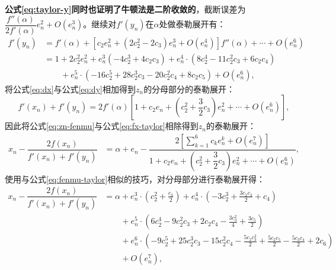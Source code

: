 \textbf{公式\ref{eq:taylor-y}同时也证明了牛顿法是二阶收敛的}，截断误差为$\dfrac{f''(\alpha)}{2f'(\alpha)}e_n^2 + O(e_n^3)$。继续对$f'(y_n)$在$\alpha$处做泰勒展开有：
\begin{equation}
    \label{eq:dy}
    \begin{aligned}
        f'(y_n) &= f'(\alpha) + [c_2e_n^2 + (2c_2^2 - 2c_3)e_n^3 + O(e_n^4)]f''(\alpha) + \cdots + O(e_n^6) \\
        &= 1 + 2 c_{2}^{2} e_n^{2} + e_n^{3} \left(- 4 c_{2}^{3} + 4 c_{2} c_{3}\right) + e_n^{4} \cdot \left(8 c_{2}^{4} - 11 c_{2}^{2} c_{3} + 6 c_{2} c_{4}\right) \\
        &\qquad + e_n^{5} \cdot \left(- 16 c_{2}^{5} + 28 c_{2}^{3} c_{3} - 20 c_{2}^{2} c_{4} + 8 c_{2} c_{5}\right) + O\left(e_n^{6}\right),
    \end{aligned}
\end{equation}
将公式\ref{eq:dx}与公式\ref{eq:dy}相加得到$z_n$的分母部分的泰勒展开：
\begin{equation}
    \label{eq:zn-fenmu}
    f'(x_n) + f'(y_n) = 2f'(\alpha)\left[ 1 + c_2e_n + \left( c_2^2 + \dfrac{3}{2}c_3 \right)e_n^2 + \cdots + O(e_n^6) \right],
\end{equation}
因此将公式\ref{eq:zn-fenmu}与公式\ref{eq:fx-taylor}相除得到$z_n$的泰勒展开：
\begin{equation}
    \begin{aligned}
        x_n - \dfrac{2f(x_n)}{f'(x_n) + f'(y_n)} &= \alpha + e_n - \dfrac{2\left[ \sum\limits_{k=1}^6 c_ke_n^k + O(e_n^7) \right]}{1 + c_2e_n+ \left(c_2^2 + \dfrac{3}{2}c_3  \right)e_n^2 + \cdots + O(e_n^6)},
    \end{aligned}
\end{equation}
使用与公式\ref{eq:fenmu-taylor}相似的技巧，对分母部分进行泰勒展开得：
\begin{equation}
    \label{eq:taylor-z}
    \begin{aligned}
        x_n - \dfrac{2f(x_n)}{f'(x_n) + f'(y_n)} &= \alpha + e_n^{3} \cdot \left(c_{2}^{2} + \frac{c_{3}}{2}\right) + e_n^{4} \cdot \left(- 3 c_{2}^{3} + \frac{3 c_{2} c_{3}}{2} + c_{4}\right) \\
        &\qquad + e_n^{5} \cdot \left(6 c_{2}^{4} - 9 c_{2}^{2} c_{3} + 2 c_{2} c_{4} - \frac{3 c_{3}^{2}}{4} + \frac{3 c_{5}}{2}\right) \\
        &\qquad + e_n^{6} \cdot \left(- 9 c_{2}^{5} + 25 c_{2}^{3} c_{3} - 15 c_{2}^{2} c_{4} - \frac{5 c_{2} c_{3}^{2}}{2} + \frac{5 c_{2} c_{5}}{2} - \frac{5 c_{3} c_{4}}{2} + 2 c_{6}\right) \\
        &\qquad + O\left(e_n^{7}\right),
    \end{aligned}
\end{equation}

